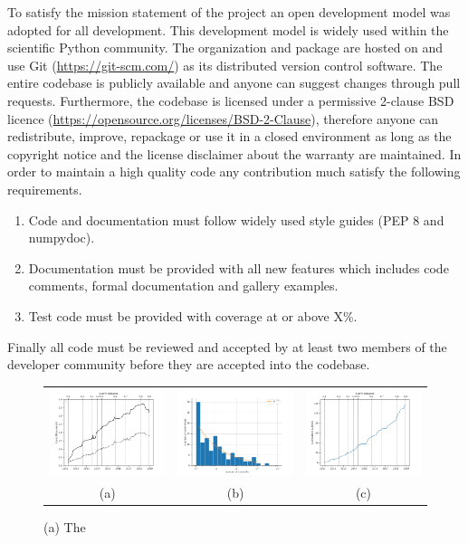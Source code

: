 To satisfy the mission statement of the project an open development model was adopted for all development. 
This development model is widely used within the scientific Python community. 
The \sunpy organization and \sunpypkg package are hosted on \github and use Git (\url{https://git-scm.com/}) as its distributed version control software.
The entire codebase is publicly available and anyone can suggest changes through pull requests. 
Furthermore, the codebase is licensed under a permissive 2-clause BSD licence (\url{https://opensource.org/licenses/BSD-2-Clause}), therefore anyone can redistribute, improve, repackage or use it in a closed environment as long as the copyright notice and the license disclaimer about the warranty are maintained. 
In order to maintain a high quality code any contribution much satisfy the following requirements.
\begin{enumerate}
    \item Code and documentation must follow widely used style guides (PEP 8 and numpydoc).
    \item Documentation must be provided with all new features which includes code comments, formal documentation and gallery examples.
    \item Test code must be provided with coverage at or above X\%.
\end{enumerate}
Finally all code must be reviewed and accepted by at least two members of the developer community before they are accepted into the codebase. 

\begin{figure}
\begin{tabular}{ccc}
  \includegraphics[width=45mm]{figures/sunpy_history.pdf} &
  \includegraphics[width=45mm]{figures/busfactor_plot.pdf} &   
  \includegraphics[width=45mm]{figures/cumulative_authors.pdf} \\
(a) & (b) & (c) \\
\end{tabular}
\caption{(a) The }
\label{fig:image2}
\end{figure}

